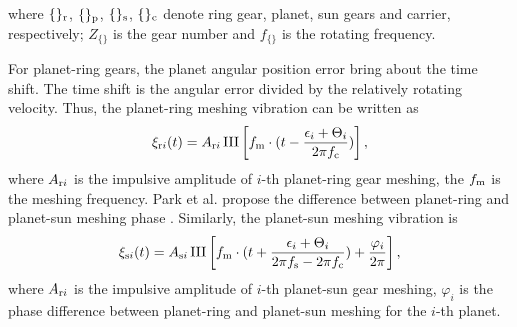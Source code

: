 \documentclass[a4paper,fleqn]{cas-sc}%
\begin{document}
where $\{\}_{\rm r}$, $\{\}_{\rm p}$, $\{\}_{\rm s}$, $\{\}_{\rm c}$ denote ring gear, planet, sun gears and carrier, respectively; $Z_{\{\}}$ is the gear number and $f_{\{\}}$ is the rotating frequency. 
\par For planet-ring gears, the planet angular position error bring about the time shift. The time shift is the angular error divided by the relatively rotating velocity. Thus, the planet-ring meshing vibration can be written as
\begin{equation}
    \xi_{{\rm r}i}(t)=A_{{\rm r}i}\operatorname{III}\left[f_{\rm m} \cdot (t-\frac{\epsilon_i+\Theta_i}{2 \pi f_{\rm c}})\right],\label{eq:planet-ring_meshing}
\end{equation}
where $A_{{\rm r}i}$ is the impulsive amplitude of $i$-th planet-ring gear meshing, the $f_{\rm m}$ is the meshing frequency. Park et al. propose the difference between planet-ring and planet-sun meshing phase \cite{Parker2004}. Similarly, the planet-sun meshing vibration is
\begin{equation}
    \xi_{{\rm s}i}(t)=A_{{\rm s}i} \operatorname{III}\left[f_{\rm m} \cdot (t + \frac{\epsilon_i+\Theta_i}{2 \pi f_{\rm s}- 2 \pi f_{\rm c}})+ \frac{\varphi_i}{2 \pi} \right],\label{eq:planet-sun_meshing}
\end{equation}
where $A_{{\rm r}i}$ is the impulsive amplitude of $i$-th planet-sun gear meshing, $\varphi_i$ is the phase difference between planet-ring and planet-sun meshing for the $i$-th planet.
\end{document}
